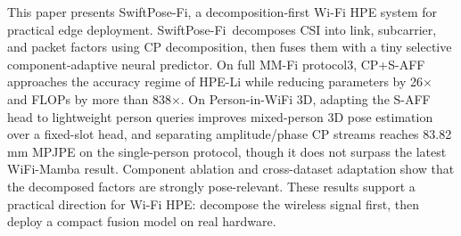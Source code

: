 \documentclass[10pt,conference]{IEEEtran}
\newcommand{\method}{SwiftPose-Fi}
\begin{document}
This paper presents \method, a decomposition-first Wi-Fi HPE system for practical edge deployment. \method\ decomposes CSI into link, subcarrier, and packet factors using CP decomposition, then fuses them with a tiny selective component-adaptive neural predictor. On full MM-Fi protocol3, CP+S-AFF approaches the accuracy regime of HPE-Li while reducing parameters by 26$\times$ and FLOPs by more than 838$\times$. On Person-in-WiFi 3D, adapting the S-AFF head to lightweight person queries improves mixed-person 3D pose estimation over a fixed-slot head, and separating amplitude/phase CP streams reaches 83.82 mm MPJPE on the single-person protocol, though it does not surpass the latest WiFi-Mamba result. Component ablation and cross-dataset adaptation show that the decomposed factors are strongly pose-relevant. These results support a practical direction for Wi-Fi HPE: decompose the wireless signal first, then deploy a compact fusion model on real hardware.
\end{document}

